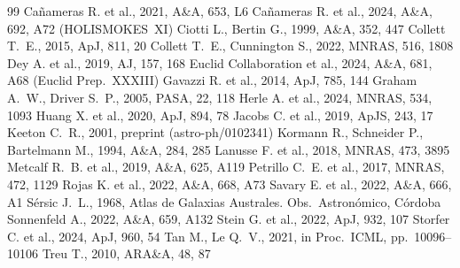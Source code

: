 \documentclass[fleqn,usenatbib]{mnras}
\begin{document}
\begin{thebibliography}{99}
 Ca\~{n}ameras R. et al., 2021, A\&A, 653, L6
 Ca\~{n}ameras R. et al., 2024, A\&A, 692, A72 (HOLISMOKES~XI)
 Ciotti L., Bertin G., 1999, A\&A, 352, 447
 Collett T.~E., 2015, ApJ, 811, 20
 Collett T.~E., Cunnington S., 2022, MNRAS, 516, 1808
 Dey A. et al., 2019, AJ, 157, 168
 Euclid Collaboration et al., 2024, A\&A, 681, A68 (Euclid Prep.~XXXIII)
 Gavazzi R. et al., 2014, ApJ, 785, 144
 Graham A.~W., Driver S.~P., 2005, PASA, 22, 118
 Herle A. et al., 2024, MNRAS, 534, 1093
 Huang X. et al., 2020, ApJ, 894, 78
 Jacobs C. et al., 2019, ApJS, 243, 17
 Keeton C.~R., 2001, preprint (astro-ph/0102341)
 Kormann R., Schneider P., Bartelmann M., 1994, A\&A, 284, 285
 Lanusse F. et al., 2018, MNRAS, 473, 3895
 Metcalf R.~B. et al., 2019, A\&A, 625, A119
 Petrillo C.~E. et al., 2017, MNRAS, 472, 1129
 Rojas K. et al., 2022, A\&A, 668, A73
 Savary E. et al., 2022, A\&A, 666, A1
 S\'{e}rsic J.~L., 1968, Atlas de Galaxias Australes. Obs.\ Astron\'{o}mico, C\'{o}rdoba
 Sonnenfeld A., 2022, A\&A, 659, A132
 Stein G. et al., 2022, ApJ, 932, 107
 Storfer C. et al., 2024, ApJ, 960, 54
 Tan M., Le Q.~V., 2021, in Proc.\ ICML, pp.\ 10096--10106
 Treu T., 2010, ARA\&A, 48, 87
\end{thebibliography}
\end{document}
